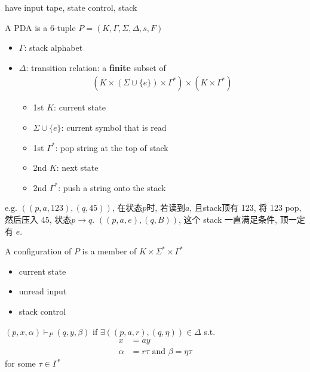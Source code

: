 have input tape, state control, stack

\begin{definition}
    A PDA is a 6-tuple $P=(K, \Gamma, \Sigma, \Delta, s, F)$
    \begin{itemize}
        \item $\Gamma$: stack alphabet
        \item $\Delta$: transition relation: a \textbf{finite} subset of 
        \begin{align*}
            (K\times (\Sigma\cup \{ e \})\times\Gamma^*)\times(K\times\Gamma^*)
        \end{align*}
        \begin{itemize}
            \item 1st $K$: current state
            \item $\Sigma\cup \{ e \}$: current symbol that is read
            \item 1st $\Gamma^*$: pop string at the top of stack
            \item 2nd $K$: next state
            \item 2nd $\Gamma^*$: push a string onto the stack
        \end{itemize}
    \end{itemize}
\end{definition}

e.g. $((p,a,123),(q,45))$, 在状态$p$时, 若读到$a$, 且stack顶有 123, 将 123 pop, 然后压入 45, 状态$p\to q$. $((p,a,e),(q,B))$, 这个 stack 一直满足条件, 顶一定有 $e$. 

\begin{definition}
    A configuration of $P$ is a member of $K\times \Sigma^*\times \Gamma^*$
    \begin{itemize}
        \item current state
        \item unread input
        \item stack control
    \end{itemize}
\end{definition}

\begin{definition}
    $(p,x,\alpha)\vdash_P (q,y,\beta)$ if $\exists ((p,a,r), (q,\eta ))\in \Delta$ s.t. 
    \begin{align*}
        x&=ay\\
        \alpha&=r\tau \text{ and }\beta = \eta \tau 
    \end{align*}
    for some $\tau \in \Gamma^*$
\end{definition}

